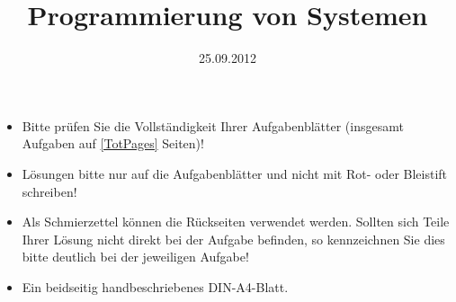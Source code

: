\documentclass{uulm-exam}
\begin{document}
\title{Programmierung von Systemen}
\date{25.09.2012}

\begin{hints}
\begin{itemize}
\item Bitte prüfen Sie die Vollständigkeit Ihrer Aufgabenblätter
(insgesamt \gettotalassignments{} Aufgaben auf  \ref{TotPages} Seiten)!
\item Lösungen bitte nur auf die Aufgabenblätter und nicht mit Rot- oder
Bleistift schreiben!
\item Als Schmierzettel können die Rückseiten verwendet werden.
Sollten sich Teile Ihrer Lösung nicht direkt bei der Aufgabe befinden, so
kennzeichnen Sie dies bitte deutlich bei der jeweiligen Aufgabe!
\end{itemize}
\end{hints}

\begin{tools}
\begin{itemize}
    \item Ein beidseitig handbeschriebenes DIN-A4-Blatt.
\end{itemize}
\end{tools}

\maketitle

\graphicspath{{aufgaben/img/}}

\begin{assignments}

\end{assignments}


% 
\end{document}
